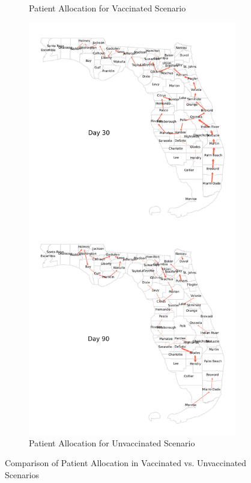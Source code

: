 \documentclass{article}
\begin{document}
\begin{figure}[h]
\begin{subfigure}{0.445\linewidth}
        \caption{Patient Allocation for Vaccinated Scenario}\label{fig:patientAllocVax}
    \end{subfigure}
    \hspace{2em}
    \begin{subfigure}{0.445\linewidth}
        \centering
        \includegraphics[width=\linewidth]{pics/paperStackedPatientTransfersNoVax.png}
        \caption{Patient Allocation for Unvaccinated Scenario}\label{fig:patientAllocNoVax}
    \end{subfigure}
    \caption{Comparison of Patient Allocation in Vaccinated vs. Unvaccinated Scenarios}\label{fig:patientAlloc}
\end{figure}
\end{document}
